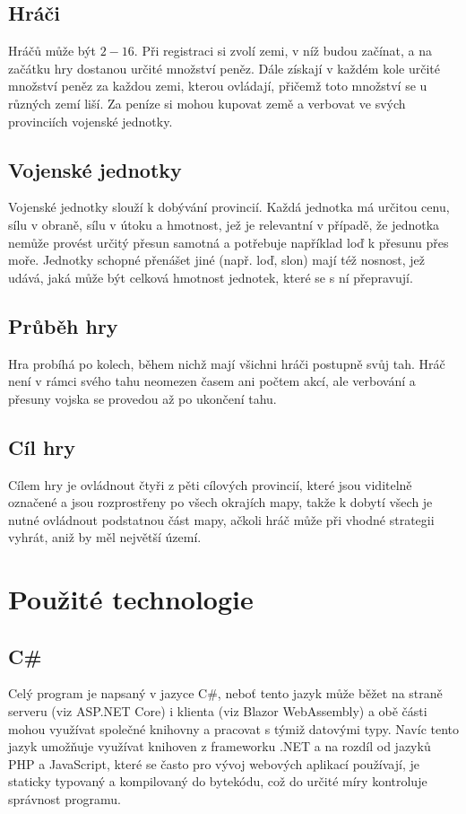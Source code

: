 \documentclass[a4paper,12pt]{article}
\begin{document}
\subsection{Hráči}
Hráčů může být $2-16$. Při registraci si zvolí zemi, v níž budou začínat, a na začátku hry dostanou určité množství peněz. Dále získají v každém kole určité množství peněz za každou zemi, kterou ovládají, přičemž toto množství se u různých zemí liší. Za peníze si mohou kupovat země a verbovat ve svých provinciích vojenské jednotky.
\subsection{Vojenské jednotky}
Vojenské jednotky slouží k dobývání provincií. Každá jednotka má určitou cenu, sílu v obraně, sílu v útoku a hmotnost, jež je relevantní v případě, že jednotka nemůže provést určitý přesun samotná a potřebuje například loď k přesunu přes moře. Jednotky schopné přenášet jiné (např. loď, slon) mají též nosnost, jež udává, jaká může být celková hmotnost jednotek, které se s ní přepravují.
\subsection{Průběh hry}
Hra probíhá po kolech, během nichž mají všichni hráči postupně svůj tah. Hráč není v rámci svého tahu neomezen časem ani počtem akcí, ale verbování a přesuny vojska se provedou až po ukončení tahu.
\subsection{Cíl hry}
Cílem hry je ovládnout čtyři z pěti cílových provincií, které jsou viditelně označené a jsou rozprostřeny po všech okrajích mapy, takže k dobytí všech je nutné ovládnout podstatnou část mapy, ačkoli hráč může při vhodné strategii vyhrát, aniž by měl největší území.

\section{Použité technologie}
\subsection{C\#}
Celý program je napsaný v jazyce C\#, neboť tento jazyk může běžet na straně serveru (viz ASP.NET Core) i klienta (viz Blazor WebAssembly) a obě části mohou využívat společné knihovny a pracovat s týmiž datovými typy. Navíc tento jazyk umožňuje využívat knihoven z frameworku .NET a na rozdíl od jazyků PHP a JavaScript, které se často pro vývoj webových aplikací používají, je staticky typovaný a kompilovaný do bytekódu, což do určité míry kontroluje správnost programu.
\end{document}
